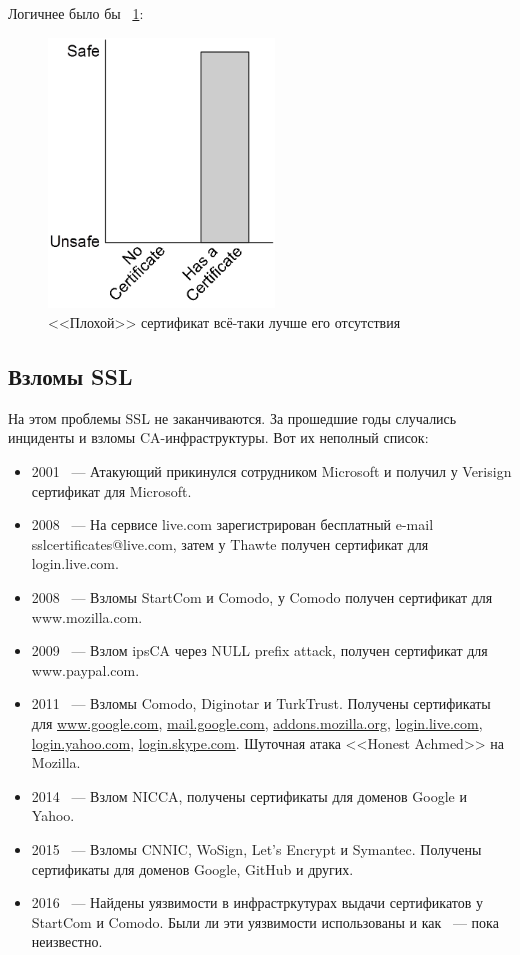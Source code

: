 \documentclass[10pt, a5paper]{article}
\begin{document}
Логичнее было бы ~\ref{Hlebnikov6}:

\begin{center}

\begin{figure}[h!]
  \centering
  \includegraphics[width=6cm]{Hlebnikov6.png}
  \caption{<<Плохой>> сертификат всё-таки лучше его
отсутствия}
  \label{Hlebnikov6}
\end{figure}

\end{center}
\subsection*{Взломы SSL}

На этом проблемы SSL не заканчиваются. За прошедшие годы случались
инциденты и взломы CA-инфраструктуры. Вот их неполный список:

\begin{itemize}
  \item 2001 ~--- Атакующий прикинулся сотрудником Microsoft и получил у
  Verisign сертификат для Microsoft.
  \item 2008 ~--- На сервисе live.com зарегистрирован бесплатный e-mail
  sslcertificates@live.com, затем у Thawte получен сертификат для
  login.live.com.
  \item 2008 ~--- Взломы StartCom и Comodo, у Comodo получен сертификат для
  www.mozilla.com.
  \item 2009 ~--- Взлом ipsCA через NULL prefix attack, получен сертификат для
  www.paypal.com.
  \item 2011 ~--- Взломы Comodo, Diginotar и TurkTrust. Получены сертификаты
  для \url{www.google.com}, \url{mail.google.com}, \linebreak \url{addons.mozilla.org},
  \url{login.live.com}, \url{login.yahoo.com}, \linebreak \url{login.skype.com}. Шуточная атака
  <<Honest Achmed>> на Mozilla.
  \item 2014 ~--- Взлом NICCA, получены сертификаты для доменов Google и Yahoo.
  \item 2015 ~--- Взломы CNNIC, WoSign, Let's Encrypt и Symantec. Получены
  сертификаты для доменов Google, GitHub и других.
  \item 2016 ~--- Найдены уязвимости в инфрастркутурах выдачи сертификатов у
  StartCom и Comodo. Были ли эти уязвимости использованы и как ~--- пока
  неизвестно.
\end{itemize}
\end{document}
